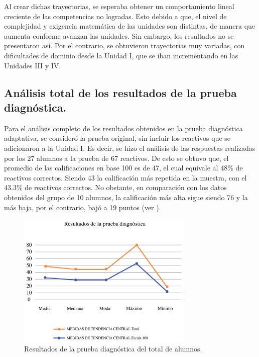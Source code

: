 \documentclass[spanish]{textolivre}
\begin{document}
Al crear dichas trayectorias, se esperaba obtener un comportamiento lineal creciente de las competencias no logradas. Esto debido a que, el nivel de complejidad y exigencia matemática de las unidades son distintas, de manera que aumenta conforme avanzan las unidades. Sin embargo, los resultados no se presentaron así. Por el contrario, se obtuvieron trayectorias muy variadas, con dificultades de dominio desde la Unidad I, que se iban incrementando en las Unidades III y IV. 

\subsection{Análisis total de los resultados de la prueba diagnóstica.}\label{sec-organizacao-latex}

Para el análisis completo de los resultados obtenidos en la prueba diagnóstica adaptativa, se consideró la prueba original, sin incluir los reactivos que se adicionaron a la Unidad I. Es decir, se hizo el análisis de las respuestas realizadas por los 27 alumnos a la prueba de 67 reactivos. De esto se obtuvo que, el promedio de las calificaciones en base 100 es de 47, el cual equivale al 48\% de reactivos correctos. Siendo 43 la calificación más repetida en la muestra, con el 43.3\% de reactivos correctos. No obstante, en comparación con los datos obtenidos del grupo de 10 alumnos, la calificación más alta sigue siendo 76 y la más baja, por el contrario, bajó a 19 puntos (ver ).

\begin{figure}[h!]
   \centering
   \includegraphics[width=0.75\textwidth]{fig-07.pdf}
   \caption{Resultados de la prueba diagnóstica del total de alumnos.}
   \label{fig:07}
\end{figure}
\end{document}
